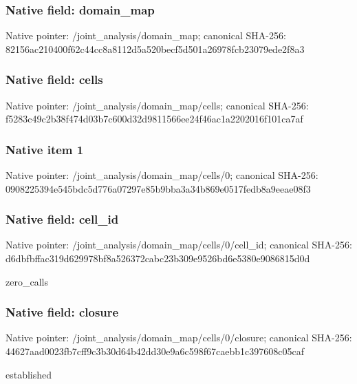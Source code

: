 \documentclass[10pt,a4paper]{article}
\begin{document}
\subsubsection{Native field: domain\_map}


Native pointer: /joint\_analysis/domain\_map; canonical SHA-256: 82156ac210400f62c44cc8a8\allowbreak{}112d5a520becf5d501a26978\allowbreak{}fcb23079ede2f8a3



\subsubsection{Native field: cells}


Native pointer: /joint\_analysis/domain\_map/cells; canonical SHA-256: f5283c49c2b38f474d03b7c6\allowbreak{}00d32d9811566ee24f46ac1a\allowbreak{}2202016f101ca7af



\subsubsection{Native item 1}


Native pointer: /joint\_analysis/domain\_map/cells/0; canonical SHA-256: 0908225394e545bdc5d776a0\allowbreak{}7297e85b9bba3a34b869e051\allowbreak{}7fedb8a9eeae08f3



\subsubsection{Native field: cell\_id}


Native pointer: /joint\_analysis/domain\_m\allowbreak{}ap/cells/0/cell\_id; canonical SHA-256: d6dbfbffac319d629978bf8a\allowbreak{}526372cabc23b309e9526bd6\allowbreak{}e5380e9086815d0d


zero\_calls


\subsubsection{Native field: closure}


Native pointer: /joint\_analysis/domain\_m\allowbreak{}ap/cells/0/closure; canonical SHA-256: 44627aad0023fb7cff9c3b30\allowbreak{}d64b42dd30e9a6c598f67cae\allowbreak{}bb1c397608c05caf


established
\end{document}
